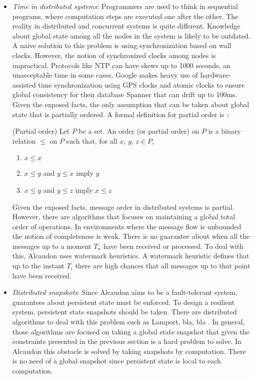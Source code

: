 \begin{itemize}
\item \textit{Time in distributed systems}:
  Programmers are used to think in sequential programs, where computation steps
  are executed one after the other. The reality in distributed and concurrent
  systems is quite different. Knowledge about global state among all the nodes
  in the system is likely to be outdated. A naive solution to this problem is
  using synchronization based on wall clocks. However, the notion of
  synchronized clocks among nodes is impractical. Protocols like NTP\cite{ntp}
  can have skews up to 1000 seconds, an unacceptable time in some cases. Google
  makes heavy use of hardware-assisted time synchronization using GPS clocks and
  atomic clocks to ensure global consistency for their database
  Spanner\cite{180268} that can drift up to 100ms. Given the exposed facts, the
  only assumption that can be taken about global state that is partially
  ordered. A formal definition for partial order is \cite{book:lattices}:
  \begin{definition}{(Partial order)}
    Let $P$ be a set. An order (or partial order) on $P$ is a binary relation
    $\leq$ on $P$ such that, for all $x$, $y$, $z \in P$,
    \begin{enumerate}
    \item $x \leq x$
    \item $x \leq y$ and $y \leq x$ imply $y$
    \item $x \leq y$ and $y \leq z$ imply $x \leq z$
    \end{enumerate}
  \end{definition}
  Given the exposed facts, message order in distributed systems is partial.
  However, there are algorithms that focuses on maintaining a global total order
  of operations\cite{vclocks}. In environments where the message flow is unbounded
  the notion of completeness is weak. There is no guarantee about when all the
  messages up to a moment $T_n$ have been received or processed. To deal with
  this, Alcaudon uses watermark heuristics. A watermark heuristic defines that up
  to the instant $T_i$ there are high chances that all messages up to that point
  have been received.
\item \textit{Distributed snapshots}:
  Since Alcaudon aims to be a fault-tolerant system, guarantees about persistent
  state must be enforced. To design a resilient system, persistent state
  snapshots should be taken. There are distributed algorithms to deal with this
  problem such as Lamport, bla, bla . In general, those algorithms are focused
  on taking a global state snapshot that given the constraints presented in the
  previous section is a hard problem to solve. In Alcaudon this obstacle is
  solved by taking snapshots by computation. There is no need of a global
  snapshot since persistent state is local to each computation.


\end{itemize}
